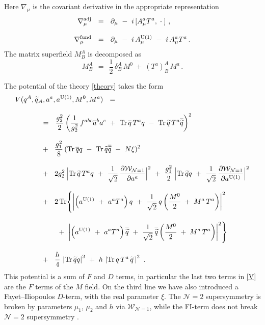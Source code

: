 \documentclass[12pt]{article}
\def\Tr{{\rm Tr}}
\newcommand{\ntwo}{${\mathcal N}=2$ }
\newcommand{\p}{\partial}
\newcommand{\wt}{\widetilde}
\newcommand{\ov}{\overline}
\newcommand{\mc}[1]{\mathcal{#1}}
\newcommand{\aU}{a^{\rm U(1)}}
\begin{document}
	Here $ \nabla_\mu $ is the covariant derivative in the appropriate representation
\begin{align*}
%
	\nabla_\mu^{\rm adj} & ~~=~~ \p_\mu  ~-~ i\, [ A_\mu^a T^a, \;\cdot\;]~, \\[3mm]
%
	\nabla_\mu^{\rm fund} & ~~=~~ \p_\mu ~-~ i\,A^{\rm U(1)}_\mu ~-~ i\, A_\mu^a T^a\,.
\end{align*}
	The matrix superfield $ M^A_B $ is decomposed as 
\[
	M^A_B ~~=~~ \frac{1}{2}\,\delta^A_B\, M^0  ~+~ (T^a)^A_B\, M^a\,.
\]

	The potential of the theory \eqref{theory} takes the form
\begin{align}
%
\notag
	& V(q^A, \wt{q}{}_A, a^a, \aU, M^0, M^a) ~~=~~ 
	\\[3mm]
%
\notag
	&\qquad\quad ~~=~~
			\frac{g_2^2}{2} \left( \frac{1}{g_2^2}\,f^{abc}\ov{a}{}^b a^c 
				~+~ \Tr\, \ov{q}\, T^a q 
				~-~ \Tr\, \wt{q}\, T^a \ov{\wt{q}} \right)^2 
	\\[3mm]
%
\label{V}
	&\qquad\quad ~~+~~
		\frac{g_1^2}{8}\, (\Tr\, \ov{q} q ~-~ \Tr\, \wt{q} \ov{\wt{q}} ~-~ N\xi )^2
	\\[3mm]
%
\notag
	&\qquad\quad ~~+~~
		2g_2^2\, \Bigl| \Tr\, \wt{q}\,T^a q ~+~ 
			\frac{1}{\sqrt{2}}\, \frac{\p\mc{W}_{\mc{N}=1}}{\p a^a} \Bigr|^2
	~+~
	\frac{g_1^2}{2}\, \Bigl| \Tr\, \wt{q} q ~+~ 
			\frac{1}{\sqrt{2}}\, \frac{\p\mc{W}_{\mc{N}=1}}{\p\aU} \Bigr|^2
	\\[3mm]
%
\notag
	&\qquad\quad ~~+~~
	2\, \Tr \Biggl\{  
		\left| \left( \aU ~+~ a^a T^a \right) q ~+~
			\frac{1}{\sqrt{2}}\, q\left( \frac{M^0}{2} \;+\; M^a\,T^a \right) \right|^2 
	\\[3mm]
%
\notag
	&\phantom{\qquad\quad ~~+~~ 2 } ~+~
		\left| \left( \aU ~+~ a^a T^a \right) \ov{\wt{q}} ~+~
			\frac{1}{\sqrt{2}}\, \ov{\wt{q}}\left( \frac{M^0}{2} \;+\; M^a\,T^a \right) \right|^2 
			\Biggr\}
	\\[3mm]
%
\notag
	&\qquad\quad ~~+~~
	\frac{h}{4}\, \left| \Tr\, \wt{q}q \right|^2  ~+~ h\,\left| \Tr\, q\,T^a\,\wt{q} \,\right|^2	
	~.
\end{align}
	This potential is a sum of $ F $ and $ D $ terms, in particular the last two terms in \eqref{V}
	are the $ F $ terms of the  $ M $ field.
	On the third line we have also introduced a Fayet--Iliopoulos $ D $-term, with the real
	parameter $ \xi $.
	The \ntwo supersymmetry is broken by parameters $ \mu_1 $, $ \mu_2 $ and $ h $ via $ \mc{W}_{\mc{N}=1} $, while
	the FI-term does not break \ntwo supersymmetry \cite{HSZ,VY}.
\end{document}
